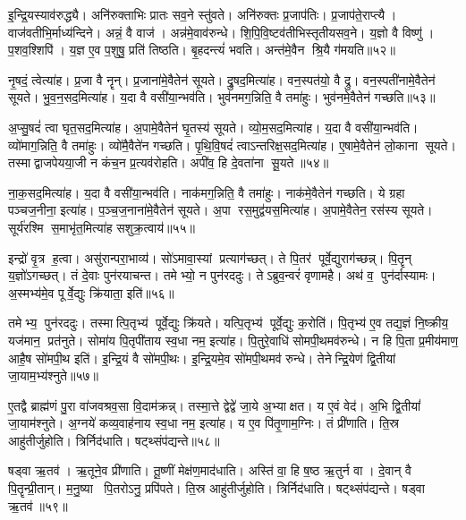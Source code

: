 इ॒न्द्रि॒यस्याव॑रुद्ध्यै। अनि॑रुक्ताभिः प्रातः सव॒ने स्तु॑वते। अनि॑रुक्तः प्र॒जाप॑तिः। प्र॒जाप॑ते॒राप्त्यै। वाज॑वतीभि॒र्माध्य॑न्दिने। अन्नं॒ वै वाज॑। अन्न॑मे॒वाव॑रुन्धे। शि॒पि॒वि॒ष्टव॑तीभिस्तृतीयसव॒ने। य॒ज्ञो वै विष्णु॑। प॒शव॒श्शिपि॑। य॒ज्ञ ए॒व प॒शुषु॒ प्रति॑ तिष्ठति। बृ॒हदन्त्यं॑ भवति। अन्त॑मे॒वैन श्रि॒यै ग॑मयति॥५२॥\anuvakamend[अ॒श्नी॒यादन्न॑स्यान्न॒स्याव॑रुद्ध्या॒ इन्द्र॑स्य त्वा॒ साम्राज्येना॒भिषि॑ञ्चा॒मीत्या॑ह वाज॒सृत॒श्शिपि॒स्त्रीणि॑ च]

नृ॒षदं॒ त्वेत्या॑ह। प्र॒जा वै नॄन्। प्र॒जाना॑मे॒वैतेन॑ सूयते। द्रु॒षद॒मित्या॑ह। वन॒स्पत॑यो॒ वै द्रु। वन॒स्पती॑नामे॒वैतेन॑ सूयते। भु॒व॒न॒सद॒मित्या॑ह। य॒दा वै वसी॑या॒न्भव॑ति। भुव॑नमग॒न्निति॒ वै तमा॑हुः। भुव॑नमे॒वैतेन॑ गच्छति॥५३॥

अ॒प्सु॒षदं॑ त्वा घृत॒सद॒मित्या॑ह। अ॒पामे॒वैतेन॑ घृ॒तस्य॑ सूयते। व्यो॒म॒सद॒मित्या॑ह। य॒दा वै वसी॑या॒न्भव॑ति। व्यो॑माग॒न्निति॒ वै तमा॑हुः। व्यो॑मै॒वैते॑न गच्छति। पृ॒थि॒वि॒षदं॑ त्वाऽन्तरिक्ष॒सद॒मित्या॑ह। ए॒षामे॒वैतेन॑ लो॒काना सूयते। तस्माद्वाजपेयया॒जी न कंच॒न प्र॒त्यव॑रोहति। अपी॑व॒ हि दे॒वता॑ना सू॒यते॥५४॥

ना॒क॒सद॒मित्या॑ह। य॒दा वै वसी॑या॒न्भव॑ति। नाक॑मग॒न्निति॒ वै तमा॑हुः। नाक॑मे॒वैतेन॑ गच्छति। ये ग्रहा पञ्चज॒नीना॒ इत्या॑ह। प॒ञ्च॒ज॒नाना॑मे॒वैतेन॑ सूयते। अ॒पा रस॒मुद्व॑यस॒मित्या॑ह। अ॒पामे॒वैतेन॒ रस॑स्य सूयते। सूर्य॑रश्मि स॒माभृ॑त॒मित्या॑ह सशुक्र॒त्वाय॑॥५५॥\anuvakamend[ग॒च्छ॒ति॒ सू॒यते॒ नव॑ च]

इन्द्रो॑ वृ॒त्र ह॒त्वा। असु॑रान्परा॒भाव्य॑। सो॑ऽमावा॒स्यां प्रत्याग॑च्छत्। ते पि॒तर॑ पूर्वे॒द्युराग॑च्छन्न्। पि॒तॄन् य॒ज्ञो॑ऽगच्छत्। तं दे॒वाः पुन॑रयाचन्त। तमेभ्यो॒ न पुन॑रददुः। तेऽब्रुव॒न्वरं॑ वृणामहै। अथ॑ व॒ पुन॑र्दास्यामः। अ॒स्मभ्य॑मे॒व पूर्वे॒द्युः क्रि॑याता॒ इति॑॥५६॥

तमेभ्य॒ पुन॑रददुः। तस्मात्पि॒तृभ्य॑ पूर्वे॒द्युः क्रि॑यते। यत्पि॒तृभ्य॑ पूर्वे॒द्युः क॒रोति॑। पि॒तृभ्य॑ ए॒व तद्य॒ज्ञं नि॒ष्क्रीय॒ यज॑मान॒ प्रत॑नुते। सोमा॑य पि॒तृपी॑ताय स्व॒धा नम॒ इत्या॑ह। पि॒तुरे॒वाधि॑ सोमपी॒थमव॑रुन्धे। न हि पि॒ता प्र॒मीय॑माण॒ आहै॒ष सो॑मपी॒थ इति॑। इ॒न्द्रि॒यं वै सो॑मपी॒थः। इ॒न्द्रि॒यमे॒व सो॑मपी॒थमव॑ रुन्धे। तेनेन्द्रि॒येण॑ द्वि॒तीयां जा॒याम॒भ्य॑श्नुते॥५७॥

ए॒तद्वै ब्राह्म॑णं पु॒रा वा॑जवश्रव॒सा वि॒दाम॑क्रन्न्। तस्मा॒त्ते द्वेद्वे॑ जा॒ये अ॒भ्याक्षत। य ए॒वं वेद॑। अ॒भि द्वि॒तीयां॑ जा॒याम॑श्नुते। अ॒ग्नये॑ कव्य॒वाह॑नाय स्व॒धा नम॒ इत्या॑ह। य ए॒व पि॑तृ॒णाम॒ग्निः। तं प्री॑णाति। ति॒स्र आहु॑तीर्जुहोति। त्रिर्निद॑धाति। षट्थ्संप॑द्यन्ते॥५८॥

षड्वा ऋ॒तव॑। ऋ॒तूने॒व प्री॑णाति। तू॒ष्णीं मेक्ष॑ण॒माद॑धाति। अस्ति॑ वा॒ हि ष॒ष्ठ ऋ॒तुर्न वा। दे॒वान् वै पि॒तॄन्प्री॒तान्। म॒नु॒ष्या पि॒तरोऽनु॒ प्रपि॑पते। ति॒स्र आहु॑तीर्जुहोति। त्रिर्निद॑धाति। षट्थ्संप॑द्यन्ते। षड्वा ऋ॒तव॑॥५९॥

